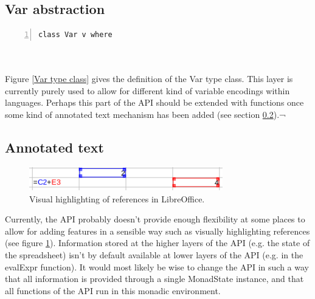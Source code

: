 \documentclass[10pt,a4paper]{article}
\begin{document}
\subsection{Var abstraction}
\label{Var abstraction}
\begin{minipage}{\linewidth}
\begin{Verbatim}[numbers=left,stepnumber=1,numbersep=5pt]
class Var v where
\end{Verbatim}
\label{Var type class}
\end{minipage}
\\\\
Figure \ref{Var type class} gives the definition of the Var type class.
This layer is currently purely used to allow for different kind of variable encodings within
languages. Perhaps this part of the API should be extended with functions once some kind of
annotated text mechanism has been added (see section \ref{Annotated text}).¬

\subsection{Annotated text}
\label{Annotated text}
\begin{figure}[H]
\centering
\includegraphics[width=0.75\textwidth]{referenceHighlighting.png}
\caption{Visual highlighting of references in LibreOffice.}
\label{Visual highlighting references}
\end{figure}
Currently, the API probably doesn't provide enough flexibility at some places to allow for adding
features in a sensible way such as visually highlighting references (see figure \ref{Visual highlighting references}).
Information stored at the higher layers of the API (e.g. the state of the spreadsheet) isn't
by default available at lower layers of the API (e.g. in the evalExpr function).
It would most likely be wise to change the API in such a way that all information is provided
through a single MonadState instance, and that all functions of the API run in this monadic
environment.
\end{document}

